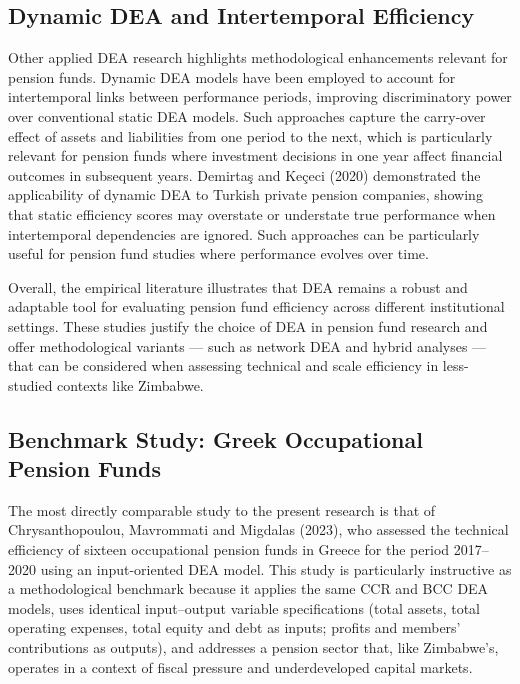\documentclass[12pt,a4paper]{article}
\begin{document}
\subsection{Dynamic DEA and Intertemporal Efficiency}

Other applied DEA research highlights methodological enhancements relevant for pension funds. Dynamic DEA models have been employed to account for intertemporal links between performance periods, improving discriminatory power over conventional static DEA models. Such approaches capture the carry-over effect of assets and liabilities from one period to the next, which is particularly relevant for pension funds where investment decisions in one year affect financial outcomes in subsequent years. Demirta\c{s} and Ke\c{c}eci (2020) demonstrated the applicability of dynamic DEA to Turkish private pension companies, showing that static efficiency scores may overstate or understate true performance when intertemporal dependencies are ignored. Such approaches can be particularly useful for pension fund studies where performance evolves over time.

Overall, the empirical literature illustrates that DEA remains a robust and adaptable tool for evaluating pension fund efficiency across different institutional settings. These studies justify the choice of DEA in pension fund research and offer methodological variants --- such as network DEA and hybrid analyses --- that can be considered when assessing technical and scale efficiency in less-studied contexts like Zimbabwe.

\subsection{Benchmark Study: Greek Occupational Pension Funds}

The most directly comparable study to the present research is that of Chrysanthopoulou, Mavrommati and Migdalas (2023), who assessed the technical efficiency of sixteen occupational pension funds in Greece for the period 2017--2020 using an input-oriented DEA model. This study is particularly instructive as a methodological benchmark because it applies the same CCR and BCC DEA models, uses identical input--output variable specifications (total assets, total operating expenses, total equity and debt as inputs; profits and members' contributions as outputs), and addresses a pension sector that, like Zimbabwe's, operates in a context of fiscal pressure and underdeveloped capital markets.
\end{document}
